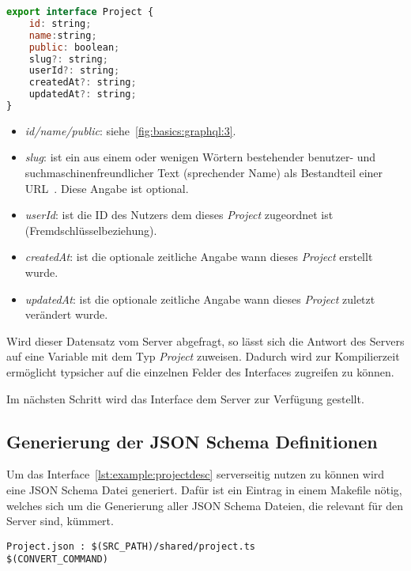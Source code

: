 \begin{lstlisting}[language=JavaScript,float=h!,caption={TypeScript Interface für die Darstellung eines Projektes}, label={lst:example:projectdesc}]
export interface Project {
    id: string;
    name:string;
    public: boolean;
    slug?: string;
    userId?: string;
    createdAt?: string;
    updatedAt?: string;
}
\end{lstlisting}

\begin{itemize}
    \setlength\itemsep{-1em}
    \item \emph{id/name/public}: siehe~\ref{fig:basics:graphql:3}.
    \item \emph{slug}: ist ein aus einem oder wenigen Wörtern bestehender benutzer- und suchmaschinenfreundlicher
    Text (sprechender Name) als Bestandteil einer URL~\cite{slug-wikipedia}. Diese Angabe ist optional.
    \item \emph{userId}: ist die ID des Nutzers dem dieses \emph{Project} zugeordnet ist (Fremdschlüsselbeziehung).
    \item \emph{createdAt}: ist die optionale zeitliche Angabe wann dieses \emph{Project} erstellt wurde.
    \item \emph{updatedAt}: ist die optionale zeitliche Angabe wann dieses \emph{Project} zuletzt verändert wurde.
\end{itemize}

Wird dieser Datensatz vom Server abgefragt, so lässt sich die Antwort des Servers auf eine Variable mit dem Typ \emph{Project} zuweisen.
Dadurch wird zur Kompilierzeit ermöglicht typsicher auf die einzelnen Felder des Interfaces zugreifen zu können.

Im nächsten Schritt wird das Interface dem Server zur Verfügung gestellt.

\subsection{Generierung der JSON Schema Definitionen}
\label{sec:requirements:example:schema}
Um das Interface~\ref{lst:example:projectdesc} serverseitig nutzen zu können wird eine JSON Schema Datei generiert.
Dafür ist ein Eintrag in einem Makefile nötig, welches sich um die Generierung aller JSON Schema Dateien,
die relevant für den Server sind, kümmert.

\begin{lstlisting}[float=h!,caption={TypeScript Interface für die Project Darstellung in einer Liste}, label={lst:example:makefile}]
Project.json : $(SRC_PATH)/shared/project.ts
$(CONVERT_COMMAND)
\end{lstlisting}

